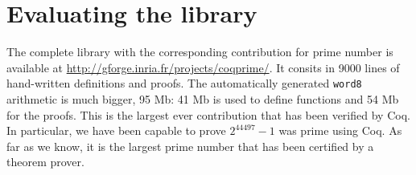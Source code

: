 \section{Evaluating the library \label{bench}}

The complete library with the corresponding contribution for prime number is available at \url{http://gforge.inria.fr/projects/coqprime/}. It consits in 9000 lines of hand-written
definitions and proofs. The automatically generated {\tt word8} arithmetic is much bigger,
95 Mb: 41 Mb is used to define functions and 54 Mb for the proofs. This is the largest ever
contribution that has been verified by {\sc Coq}. In particular, we have been capable to
prove $2^{44497} - 1$ was prime using {\sc Coq}. As far as we know, it is the largest 
prime number  that has been certified by a theorem prover.

